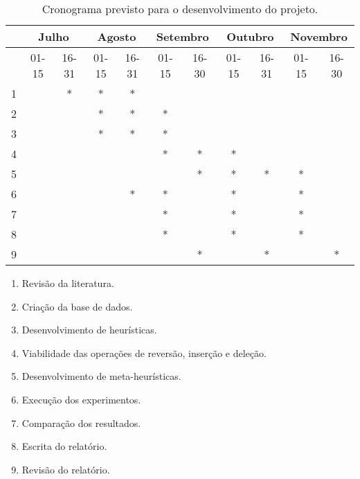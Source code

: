 \documentclass[a4paper, 11pt]{article}
\begin{document}
        \begin{table}[H]
            \centering
            \begin{tabular}{|c|c|c|c|c|c|c|c|c|c|c|}
                \hline
                 & \multicolumn{2}{c|}{Julho} & \multicolumn{2}{c|}{Agosto} & \multicolumn{2}{c|}{Setembro} & \multicolumn{2}{c|}{Outubro} & \multicolumn{2}{c|}{Novembro} \\
                \hline
                 & 01-15 & 16-31 & 01-15 & 16-31 & 01-15 & 16-30 & 01-15 & 16-31 & 01-15 & 16-30 \\
                \hline
                1 & &*&*&*& & & & & & \\
                \hline
                2 & & &*&*&*& & & & & \\
                \hline
                3 & & &*&*&*& & & & & \\
                \hline
                4 & & & & &*&*&*& & & \\
                \hline
                5 & & & & & &*&*&*&*& \\
                \hline
                6 & & & &*&*& &*& &*& \\
                \hline
                7 & & & & &*& &*& &*& \\
                \hline
                8 & & & & &*& &*& &*& \\
                \hline
                9 & & & & & &*& &*& &*\\
                \hline
            \end{tabular}
            \caption{Cronograma previsto para o desenvolvimento do projeto.}
            \label{tab:cronograma}
        \end{table}

        \begin{enumerate}[itemsep=0pt]
            \item Revisão da literatura.
            \item Criação da base de dados.
            \item Desenvolvimento de heurísticas.
            \item Viabilidade das operações de reversão, inserção e deleção.
            \item Desenvolvimento de meta-heurísticas.
            \item Execução dos experimentos.
            \item Comparação dos resultados.
            \item Escrita do relatório.
            \item Revisão do relatório.
        \end{enumerate}
\end{document}
